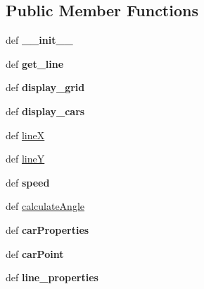 \subsection*{Public Member Functions}
\begin{DoxyCompactItemize}
\item 
\hypertarget{classmininet_1_1vanet_1_1vanet_a4b3aaaeb47e58238dcdb4ab99abccde9}{def {\bfseries \-\_\-\-\_\-init\-\_\-\-\_\-}}\label{classmininet_1_1vanet_1_1vanet_a4b3aaaeb47e58238dcdb4ab99abccde9}

\item 
\hypertarget{classmininet_1_1vanet_1_1vanet_a0066e684d94fd7ca031da85c004ce459}{def {\bfseries get\-\_\-line}}\label{classmininet_1_1vanet_1_1vanet_a0066e684d94fd7ca031da85c004ce459}

\item 
\hypertarget{classmininet_1_1vanet_1_1vanet_ab11f87b75da74c1512381f45f9414f6f}{def {\bfseries display\-\_\-grid}}\label{classmininet_1_1vanet_1_1vanet_ab11f87b75da74c1512381f45f9414f6f}

\item 
\hypertarget{classmininet_1_1vanet_1_1vanet_a8860ce06193d77788098898b2f681be3}{def {\bfseries display\-\_\-cars}}\label{classmininet_1_1vanet_1_1vanet_a8860ce06193d77788098898b2f681be3}

\item 
def \hyperlink{classmininet_1_1vanet_1_1vanet_adf3763fc1454a2d331174d7d01e6970a}{line\-X}
\item 
def \hyperlink{classmininet_1_1vanet_1_1vanet_af389f4e10b6452ca35294df3ef8389c9}{line\-Y}
\item 
\hypertarget{classmininet_1_1vanet_1_1vanet_a410f8b14747cff673fdd2b6a99bd89fd}{def {\bfseries speed}}\label{classmininet_1_1vanet_1_1vanet_a410f8b14747cff673fdd2b6a99bd89fd}

\item 
def \hyperlink{classmininet_1_1vanet_1_1vanet_ab60269aab21010e41167011d138f9186}{calculate\-Angle}
\item 
\hypertarget{classmininet_1_1vanet_1_1vanet_a805ca491ce2e5976c44dc04096700e1b}{def {\bfseries car\-Properties}}\label{classmininet_1_1vanet_1_1vanet_a805ca491ce2e5976c44dc04096700e1b}

\item 
\hypertarget{classmininet_1_1vanet_1_1vanet_a7bd200d3011209db888ab1e14e75b70d}{def {\bfseries car\-Point}}\label{classmininet_1_1vanet_1_1vanet_a7bd200d3011209db888ab1e14e75b70d}

\item 
\hypertarget{classmininet_1_1vanet_1_1vanet_a3a16f849100b1611bf86453c13c13243}{def {\bfseries line\-\_\-properties}}\label{classmininet_1_1vanet_1_1vanet_a3a16f849100b1611bf86453c13c13243}


\end{DoxyCompactItemize}
